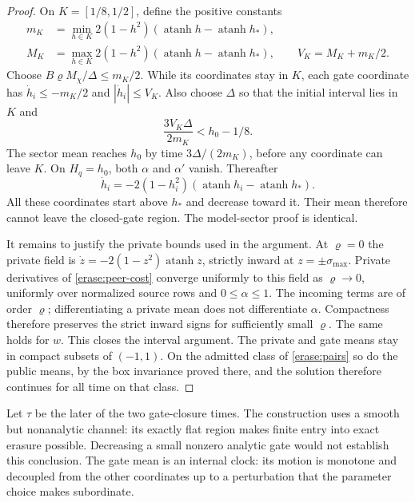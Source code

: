 \begin{proof}
On $K=[1/8,1/2]$, define the positive constants
\begin{equation}
 \begin{aligned}
 m_K&=\min_{h\in K}2(1-h^2)
                (\operatorname{atanh}h-\operatorname{atanh}h_*),\\
 M_K&=\max_{h\in K}2(1-h^2)
                (\operatorname{atanh}h-\operatorname{atanh}h_*),
 \qquad V_K=M_K+m_K/2.
 \end{aligned}
\end{equation}
Choose $B\varrho M_\chi/\Delta\leq m_K/2$. While its coordinates stay in $K$, each gate coordinate has $\dot h_i\leq-m_K/2$ and $|\dot h_i|\leq V_K$. Also choose $\Delta$ so that the initial interval lies in $K$ and
\begin{equation}
 \frac{3V_K\Delta}{2m_K}<h_0-1/8.
 \label{erase:time-choice}
\end{equation}
The sector mean reaches $h_0$ by time $3\Delta/(2m_K)$, before any coordinate can leave $K$. On $H_q=h_0$, both $\alpha$ and $\alpha'$ vanish. Thereafter
\begin{equation}
 \dot h_i=-2(1-h_i^2)
           (\operatorname{atanh}h_i-\operatorname{atanh}h_*).
 \label{erase:closed-clock}
\end{equation}
All these coordinates start above $h_*$ and decrease toward it. Their mean therefore cannot leave the closed-gate region. The model-sector proof is identical.

It remains to justify the private bounds used in the argument. At $\varrho=0$ the private field is
$\dot z=-2(1-z^2)\operatorname{atanh}z$, strictly inward at $z=\pm\sigma_{\max}$. Private derivatives of \cref{erase:peer-cost} converge uniformly to this field as $\varrho\to0$, uniformly over normalized source rows and $0\leq\alpha\leq1$. The incoming terms are of order $\varrho$; differentiating a private mean does not differentiate $\alpha$. Compactness therefore preserves the strict inward signs for sufficiently small $\varrho$. The same holds for $w$. This closes the interval argument. The private and gate means stay in compact subsets of $(-1,1)$. On the admitted class of \cref{erase:pairs} so do the public means, by the box invariance proved there, and the solution therefore continues for all time on that class.
\end{proof}

Let $\tau$ be the later of the two gate-closure times. The construction uses a smooth but nonanalytic channel: its exactly flat region makes finite entry into exact erasure possible. Decreasing a small nonzero analytic gate would not establish this conclusion. The gate mean is an internal clock: its motion is monotone and decoupled from the other coordinates up to a perturbation that the parameter choice makes subordinate.


